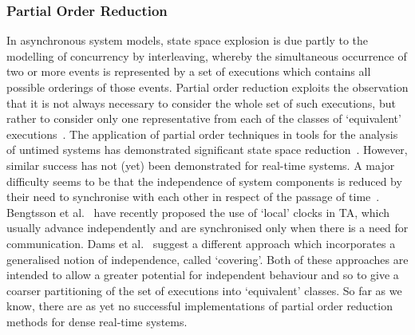 {\subsubsection{Partial Order Reduction}
In asynchronous system models, state space explosion is due partly to
the modelling of concurrency by interleaving, whereby the simultaneous
occurrence of two or more events is represented by a set of executions
which contains all possible orderings of those events. Partial order
reduction exploits the observation that it is not always necessary to
consider the whole set of such executions, but rather to consider only
one representative from each of the classes of `equivalent'
executions~\cite{god:96,pel:92,val:93}. The application of partial
order techniques in tools for the analysis of untimed systems has
demonstrated significant state space
reduction~\cite{hol:96,hp:94}. However, similar success has not (yet)
been demonstrated for real-time systems. A major difficulty seems to
be that the independence of system components is reduced by their need
to synchronise with each other in respect of the passage of
time~\cite{ys:96,pag:96,pag:97}. Bengtsson et al.~\cite{bjl:98} have
recently proposed the use of `local' clocks in TA, which usually
advance independently and are synchronised only when there is a need
for communication.  Dams et al.~\cite{dgk:98} suggest a different
approach which incorporates a generalised notion of independence, called
`covering'. Both of these approaches are intended to allow a greater
potential for independent behaviour and so to give a coarser
partitioning of the set of executions into `equivalent' classes. So
far as we know, there are as yet no successful implementations of
partial order reduction methods for dense real-time systems.

}
